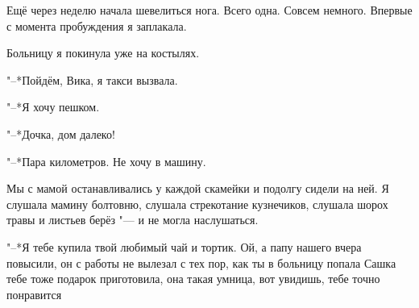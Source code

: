 Ещё через неделю начала шевелиться нога.
Всего одна.
Совсем немного.
Впервые с момента пробуждения я заплакала.

Больницу я покинула уже на костылях.

"--*Пойдём, Вика, я такси вызвала.

"--*Я хочу пешком.

"--*Дочка, дом далеко!

"--*Пара километров.
Не хочу в машину.

Мы с мамой останавливались у каждой скамейки и подолгу сидели на ней.
Я слушала мамину болтовню, слушала стрекотание кузнечиков, слушала шорох травы и листьев берёз "--- и не могла наслушаться.

"--*Я тебе купила твой любимый чай и тортик.
Ой, а папу нашего вчера повысили, он с работы не вылезал с тех пор, как ты в больницу попала\ldotst
Сашка тебе тоже подарок приготовила, она такая умница, вот увидишь, тебе точно понравится\ldotst


